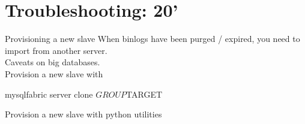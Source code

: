 \documentclass{beamer}[10]
\begin{document}
\section{Troubleshooting: 20'}
\begin{pyframe}{Provisioning a new slave}
When binlogs have been purged / expired, you need to
import from another server.\\

Caveats on big databases. \\

Provision a new slave with
\begin{bashcode}
mysqlfabric server clone $GROUP $TARGET
\end{bashcode}

Provision a new slave with python utilities
\end{pyframe}

\end{document}
